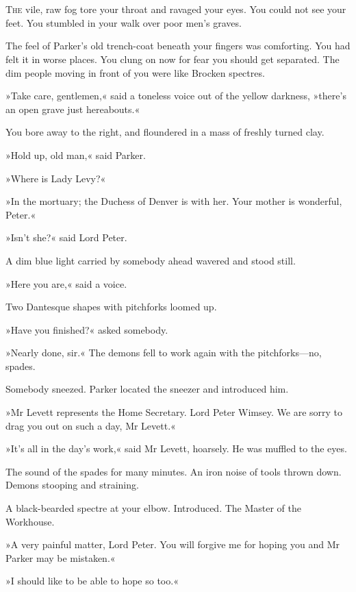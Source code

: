 \chapter[Chapter \thechapter]{}
\lettrine[lines=4]{T}{he} vile, raw fog tore your throat and ravaged your eyes. You could not see your feet. You stumbled in your walk over poor men's graves.

The feel of Parker's old trench-coat beneath your fingers was comforting. You had felt it in worse places. You clung on now for fear you should get separated. The dim people moving in front of you were like Brocken spectres.

»Take care, gentlemen,« said a toneless voice out of the yellow darkness, »there's an open grave just hereabouts.«

You bore away to the right, and floundered in a mass of freshly turned clay.

»Hold up, old man,« said Parker.

»Where is Lady Levy?«

»In the mortuary; the Duchess of Denver is with her. Your mother is wonderful, Peter.«

»Isn't she?« said Lord Peter.

A dim blue light carried by somebody ahead wavered and stood still.

»Here you are,« said a voice.

Two Dantesque shapes with pitchforks loomed up.

»Have you finished?« asked somebody.

»Nearly done, sir.« The demons fell to work again with the pitchforks\allowbreak---\allowbreak no, spades.

Somebody sneezed. Parker located the sneezer and introduced him.

»Mr Levett represents the Home Secretary. Lord Peter Wimsey. We are sorry to drag you out on such a day, Mr Levett.«

»It's all in the day's work,« said Mr Levett, hoarsely. He was muffled to the eyes.

The sound of the spades for many minutes. An iron noise of tools thrown down. Demons stooping and straining.

A black-bearded spectre at your elbow. Introduced. The Master of the Workhouse.

»A very painful matter, Lord Peter. You will forgive me for hoping you and Mr Parker may be mistaken.«

»I should like to be able to hope so too.«

